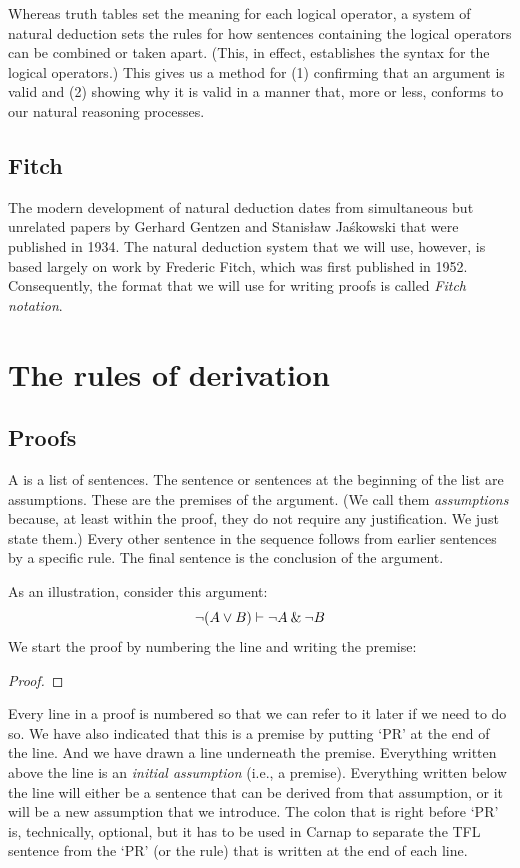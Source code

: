 Whereas truth tables set the meaning for each logical operator, a system of natural deduction sets the rules for how sentences containing the logical operators can be combined or taken apart. (This, in effect, establishes the syntax for the logical operators.) This gives us a method for (1) confirming that an argument is valid and (2) showing why it is valid in a manner that, more or less, conforms to our natural reasoning processes. 



\section{Fitch} The modern development of natural deduction dates from simultaneous but unrelated papers by Gerhard Gentzen and Stanisław Jaśkowski that were published in 1934. The natural deduction system that we will use, however, is based largely on work by Frederic Fitch, which was first published in 1952. Consequently, the format that we will use for writing proofs is called \textit{Fitch notation}.



\chapter{The rules of derivation}\label{s:BasicTFL}

\section{Proofs}

A  is a list of sentences. The sentence or sentences at the beginning of the list are assumptions. These are the premises of the argument. (We call them \textit{assumptions} because, at least within the proof, they do not require any justification. We just state them.) Every other sentence in the sequence follows from earlier sentences by a specific rule. The final sentence is the conclusion of the argument.

As an illustration, consider this argument:
	$${\neg} (A \vee B) \vdash {\neg} A \mathbin{\&} {\neg} B$$
We start the proof by numbering the line and writing the premise:
\begin{proof}
	 \pr{}
\end{proof}
Every line in a proof is numbered so that we can refer to it later if we need to do so. We have also indicated that this is a premise by putting `PR' at the end of the line. And we have drawn a line underneath the premise. Everything written above the line is an \emph{initial assumption} (i.e., a premise). Everything written below the line will either be a sentence that can be derived from that assumption, or it will be a new assumption that we introduce. The colon that is right before `PR' is, technically, optional, but it has to be used in Carnap to separate the TFL sentence from the `PR' (or the rule) that is written at the end of each line.


